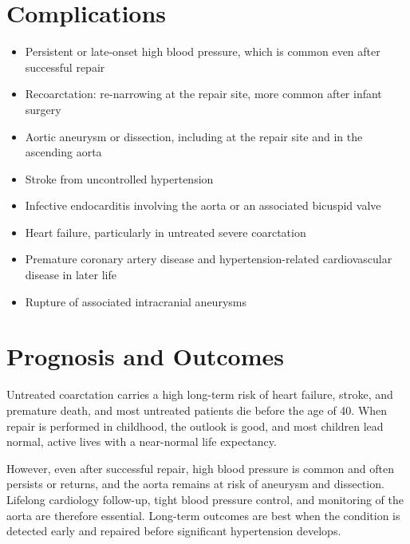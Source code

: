 \section*{Complications}
\begin{itemize}
    \item Persistent or late-onset high blood pressure, which is common even after successful repair
    \item Recoarctation: re-narrowing at the repair site, more common after infant surgery
    \item Aortic aneurysm or dissection, including at the repair site and in the ascending aorta
    \item Stroke from uncontrolled hypertension
    \item Infective endocarditis involving the aorta or an associated bicuspid valve
    \item Heart failure, particularly in untreated severe coarctation
    \item Premature coronary artery disease and hypertension-related cardiovascular disease in later life
    \item Rupture of associated intracranial aneurysms
\end{itemize}

\section*{Prognosis and Outcomes}
Untreated coarctation carries a high long-term risk of heart failure, stroke, and premature death, and most untreated patients die before the age of 40. When repair is performed in childhood, the outlook is good, and most children lead normal, active lives with a near-normal life expectancy.

However, even after successful repair, high blood pressure is common and often persists or returns, and the aorta remains at risk of aneurysm and dissection. Lifelong cardiology follow-up, tight blood pressure control, and monitoring of the aorta are therefore essential. Long-term outcomes are best when the condition is detected early and repaired before significant hypertension develops.

